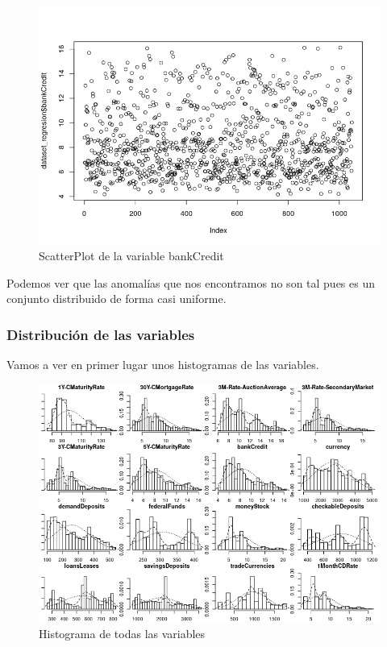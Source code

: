 \documentclass[12pt,a4paper]{article}
\begin{document}
\begin{figure}[H]
	\centering
	\includegraphics[scale=0.8]{./Imagenes/scatterplot_bankCredit.png}
	\caption{ScatterPlot de la variable bankCredit}
\end{figure}

Podemos ver que las anomalías que nos encontramos no son tal pues es un conjunto distribuido de forma casi uniforme.

\subsubsection{Distribución de las variables}

Vamos a ver en primer lugar unos histogramas de las variables.

\begin{figure}[H]
	\centering
	\includegraphics[scale=0.85]{./Imagenes/histograma_todas.png}
	\caption{Histograma de todas las variables}
\end{figure}
\end{document}
